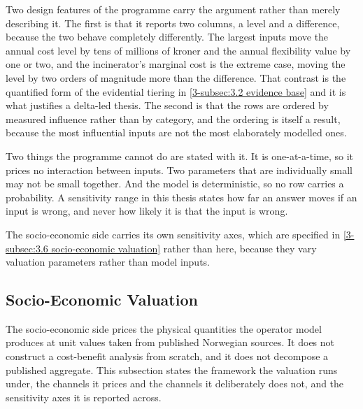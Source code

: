 Two design features of the programme carry the argument rather than merely describing it. The first is that it reports two columns, a level and a difference, because the two behave completely differently. The largest inputs move the annual cost level by tens of millions of kroner and the annual flexibility value by one or two, and the incinerator's marginal cost is the extreme case, moving the level by two orders of magnitude more than the difference. That contrast is the quantified form of the evidential tiering in \autoref{3-subsec:3.2 evidence base} and it is what justifies a delta-led thesis. The second is that the rows are ordered by measured influence rather than by category, and the ordering is itself a result, because the most influential inputs are not the most elaborately modelled ones.

Two things the programme cannot do are stated with it. It is one-at-a-time, so it prices no interaction between inputs. Two parameters that are individually small may not be small together. And the model is deterministic, so no row carries a probability. A sensitivity range in this thesis states how far an answer moves if an input is wrong, and never how likely it is that the input is wrong.

The socio-economic side carries its own sensitivity axes, which are specified in \autoref{3-subsec:3.6 socio-economic valuation} rather than here, because they vary valuation parameters rather than model inputs.

\subsection{Socio-Economic Valuation}
\label{3-subsec:3.6 socio-economic valuation}

The socio-economic side prices the physical quantities the operator model produces at unit values taken from published Norwegian sources. It does not construct a cost-benefit analysis from scratch, and it does not decompose a published aggregate. This subsection states the framework the valuation runs under, the channels it prices and the channels it deliberately does not, and the sensitivity axes it is reported across.

